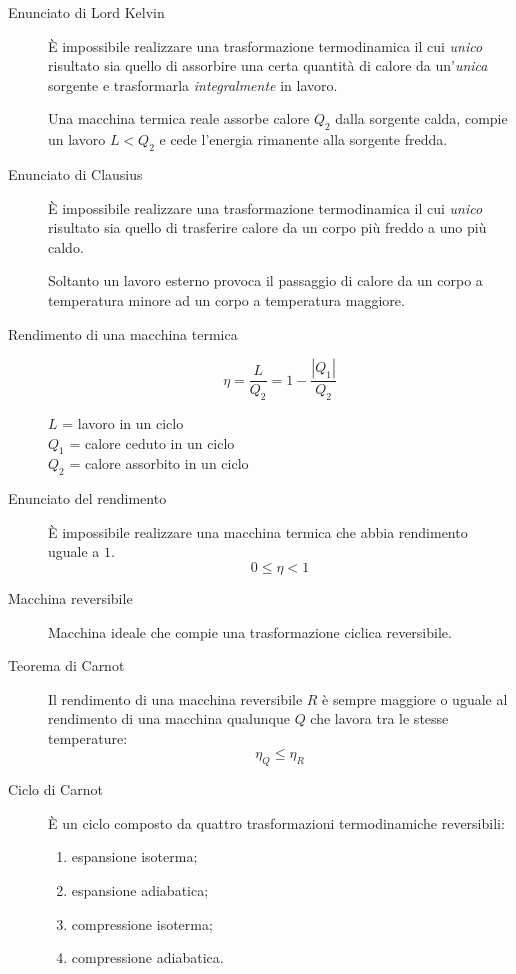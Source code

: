 \documentclass[a4paper,11pt,italian]{article}
\begin{document}
\begin{description}
  \item[Enunciato di Lord Kelvin] 
  È impossibile realizzare una trasformazione termodinamica il cui \emph{unico} risultato sia quello di assorbire una certa quantità di calore da un'\emph{unica} sorgente e trasformarla \emph{integralmente} in lavoro.
  
  Una macchina termica reale assorbe calore $ Q_2 $ dalla sorgente calda, compie un lavoro $ L< Q_2 $ e cede l'energia rimanente alla sorgente fredda.
  
  \item[Enunciato di Clausius] 
  È impossibile realizzare una trasformazione termodinamica il cui \emph{unico} risultato sia quello di trasferire calore da un corpo più freddo a uno più caldo.
   
   Soltanto un lavoro esterno provoca il passaggio di calore da un corpo a temperatura minore ad un corpo a temperatura maggiore.

  \item[Rendimento di una macchina termica]
  \[ \eta = \frac{L}{Q_2} = 1 - \frac{|Q_1|}{Q_2} \]
  \begin{multicols}{2}
  $ L $ = lavoro in un ciclo\\
  $ Q_1 $ = calore ceduto in un ciclo\\
  $ Q_2 $ = calore assorbito in un ciclo
  \end{multicols}
  
  \item[Enunciato del rendimento] 
  È impossibile realizzare una macchina termica che abbia rendimento uguale a $ 1 $.
  \[ 0 \leq \eta < 1 \]
  
  \item[Macchina reversibile] 
  Macchina ideale che compie una trasformazione ciclica reversibile.
  
  \item[Teorema di Carnot] 
  Il rendimento di una macchina reversibile $ R $ è sempre maggiore o uguale al rendimento di una macchina qualunque $ Q $ che lavora tra le stesse temperature:
  \[ \eta_Q \leq \eta_R \]
  
  \item[Ciclo di Carnot] 
  È un ciclo composto da quattro trasformazioni termodinamiche reversibili:
  \begin{multicols}{2}
  \begin{enumerate}
    \item espansione isoterma;
    \item espansione adiabatica;
    \item compressione isoterma;
    \item compressione adiabatica.
  \end{enumerate}
  \end{multicols}


\end{description}
\end{document}
